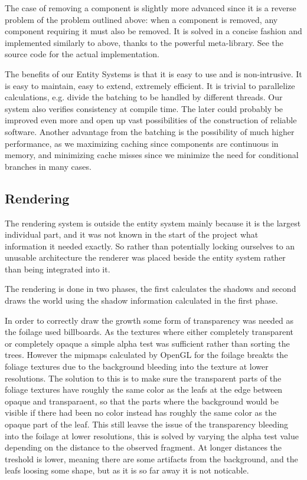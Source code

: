 The case of removing a component is slightly more advanced since it is a reverse problem of the problem outlined above: when a component is removed, any component requiring it must also be removed. It is solved in a concise fashion and implemented similarly to above, thanks to the powerful meta-library. See the source code for the actual implementation.

The benefits of our Entity Systems is that it is easy to use and is non-intrusive. It is easy to maintain, easy to extend, extremely efficient. It is trivial to parallelize calculations, e.g. divide the batching to be handled by different threads. Our system also verifies consistency at compile time. The later could probably be improved even more and open up vast possibilities of the construction of reliable software. Another advantage from the batching is the possibility of much higher performance, as we maximizing caching since components are continuous in memory, and minimizing cache misses since we minimize the need for conditional branches in many cases.

\newpage
\subsection{Rendering}
The rendering system is outside the entity system mainly because it is the largest individual part, and it was not known in the start of the project what information it needed exactly. So rather than potentially locking ourselves to an unusable architecture the renderer was placed beside the entity system rather than being integrated into it.

The rendering is done in two phases, the first calculates the shadows and second draws the world using the shadow information calculated in the first phase.

In order to correctly draw the growth some form of transparency was needed as the foilage used billboards. As the textures where either completely transparent or completely opaque a simple alpha test was sufficient rather than sorting the trees. However the mipmaps calculated by OpenGL for the foilage breakts the foliage textures due to the background bleeding into the texture at lower resolutions. The solution to this is to make sure the transparent parts of the foliage textures have roughly the same color as the leafs at the edge between opaque and transparaent, so that the parts where the background would be visible if there had been no color instead has roughly the same color as the opaque part of the leaf. This still leavse the issue of the transparency bleeding into the foilage at lower resolutions, this is solved by varying the alpha test value depending on the distance to the observed fragment. At longer distances the treshold is lower, meaning there are some artifacts from the background, and the leafs loosing some shape, but as it is so far away it is not noticable.

